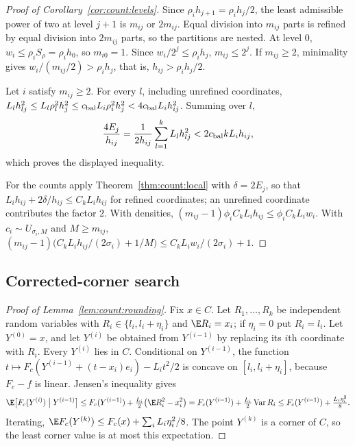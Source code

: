 \begin{proof}[Proof of Corollary~\ref{cor:count:levels}]
Since $\rho_ih_{j+1}=\rho_ih_j/2$, the least admissible power of two at level
$j+1$ is $m_{ij}$ or $2m_{ij}$. Equal division into $m_{ij}$ parts is refined
by equal division into $2m_{ij}$ parts, so the partitions are nested. At
level $0$, $w_i\le\rho_iS_\rho=\rho_ih_0$, so $m_{i0}=1$. Since
$w_i/2^j\le\rho_ih_j$, $m_{ij}\le2^j$. If $m_{ij}\ge2$, minimality gives
$w_i/(m_{ij}/2)>\rho_ih_j$, that is, $h_{ij}>\rho_ih_j/2$.

Let $i$ satisfy $m_{ij}\ge2$. For every $l$, including unrefined
coordinates,
$L_lh_{lj}^2\le L_l\rho_l^2h_j^2\le c_{\rm bal}L_i\rho_i^2h_j^2
<4c_{\rm bal}L_ih_{ij}^2$. Summing over $l$,
\[
 \frac{4E_j}{h_{ij}}=\frac1{2h_{ij}}\sum_{l=1}^kL_lh_{lj}^2
 <2c_{\rm bal}kL_ih_{ij},
\]
which proves the displayed inequality.

For the counts apply Theorem~\ref{thm:count:local} with $\delta=2E_j$, so
that $L_ih_{ij}+2\delta/h_{ij}\le C_kL_ih_{ij}$ for refined coordinates;
an unrefined coordinate contributes the factor $2$. With densities,
$(m_{ij}-1)\phi_iC_kL_ih_{ij}\le\phi_iC_kL_iw_i$. With
$c_i\sim U_{\sigma_i,M}$ and $M\ge m_{ij}$,
$(m_{ij}-1)\bigl(C_kL_ih_{ij}/(2\sigma_i)+1/M\bigr)\le C_kL_iw_i/(2\sigma_i)+1$.
\end{proof}

\subsection{Corrected-corner search}

\begin{proof}[Proof of Lemma~\ref{lem:count:rounding}]
Fix $x\in C$. Let $R_1,\dots,R_k$ be independent random variables with
$R_i\in\{l_i,l_i+\eta_i\}$ and $\E R_i=x_i$; if $\eta_i=0$ put $R_i=l_i$. Let
$Y^{(0)}=x$, and let $Y^{(i)}$ be obtained from $Y^{(i-1)}$ by replacing its
$i$th coordinate with $R_i$. Every $Y^{(i)}$ lies in $C$. Conditional on
$Y^{(i-1)}$, the function $t\mapsto F_c(Y^{(i-1)}+(t-x_i)e_i)-L_it^2/2$ is
concave on $[l_i,l_i+\eta_i]$, because $F_c-f$ is linear. Jensen's
inequality gives
\[
 \E\bigl[F_c(Y^{(i)})\bigm|Y^{(i-1)}\bigr]
 \le F_c(Y^{(i-1)})+\tfrac{L_i}2\bigl(\E R_i^2-x_i^2\bigr)
 =F_c(Y^{(i-1)})+\tfrac{L_i}2\operatorname{Var}R_i
 \le F_c(Y^{(i-1)})+\tfrac{L_i\eta_i^2}8 .
\]
Iterating, $\E F_c(Y^{(k)})\le F_c(x)+\sum_iL_i\eta_i^2/8$. The point
$Y^{(k)}$ is a corner of $C$, so the least corner value is at most this
expectation.
\end{proof}

